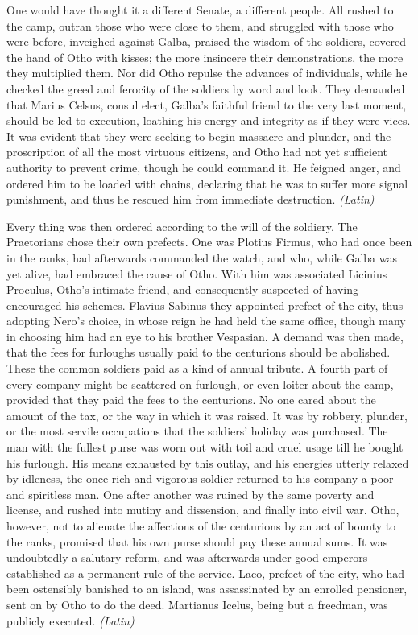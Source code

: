 
One would have thought it a different Senate, a different people. All rushed to the camp, outran those who were close to them, and struggled with those who were before, inveighed against Galba, praised the wisdom of the soldiers, covered the hand of Otho with kisses; the more insincere their demonstrations, the more they multiplied them. Nor did Otho repulse the advances of individuals, while he checked the greed and ferocity of the soldiers by word and look. They demanded that Marius Celsus, consul elect, Galba's faithful friend to the very last moment, should be led to execution, loathing his energy and integrity as if they were vices. It was evident that they were seeking to begin massacre and plunder, and the proscription of all the most virtuous citizens, and Otho had not yet sufficient authority to prevent crime, though he could command it. He feigned anger, and ordered him to be loaded with chains, declaring that he was to suffer more signal punishment, and thus he rescued him from immediate destruction. \emph{(Latin)}


Every thing was then ordered according to the will of the soldiery. The Praetorians chose their own prefects. One was Plotius Firmus, who had once been in the ranks, had afterwards commanded the watch, and who, while Galba was yet alive, had embraced the cause of Otho. With him was associated Licinius Proculus, Otho's intimate friend, and consequently suspected of having encouraged his schemes. Flavius Sabinus they appointed prefect of the city, thus adopting Nero's choice, in whose reign he had held the same office, though many in choosing him had an eye to his brother Vespasian. A demand was then made, that the fees for furloughs usually paid to the centurions should be abolished. These the common soldiers paid as a kind of annual tribute. A fourth part of every company might be scattered on furlough, or even loiter about the camp, provided that they paid the fees to the centurions. No one cared about the amount of the tax, or the way in which it was raised. It was by robbery, plunder, or the most servile occupations that the soldiers' holiday was purchased. The man with the fullest purse was worn out with toil and cruel usage till he bought his furlough. His means exhausted by this outlay, and his energies utterly relaxed by idleness, the once rich and vigorous soldier returned to his company a poor and spiritless man. One after another was ruined by the same poverty and license, and rushed into mutiny and dissension, and finally into civil war. Otho, however, not to alienate the affections of the centurions by an act of bounty to the ranks, promised that his own purse should pay these annual sums. It was undoubtedly a salutary reform, and was afterwards under good emperors established as a permanent rule of the service. Laco, prefect of the city, who had been ostensibly banished to an island, was assassinated by an enrolled pensioner, sent on by Otho to do the deed. Martianus Icelus, being but a freedman, was publicly executed. \emph{(Latin)}

